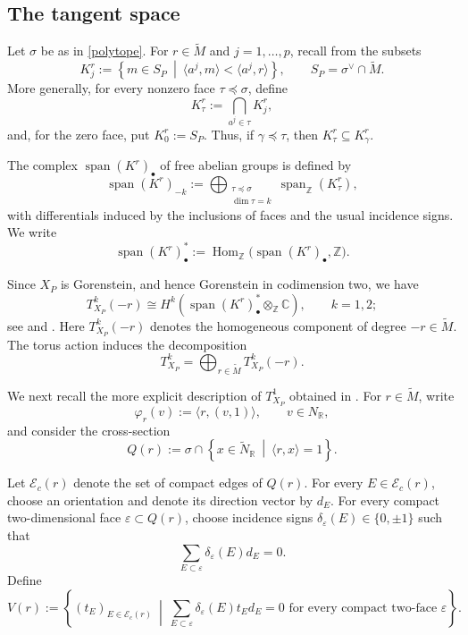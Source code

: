 \documentclass[11pt]{amsart}
\numberwithin{equation}{section}
\theoremstyle{plain}
\theoremstyle{definition}
\newcommand{\0}{$0$-mutable}
\newcommand{\RR}{\ensuremath{\mathbb{R}}}
\newcommand{\CC}{\ensuremath{\mathbb{C}}}
\newcommand{\ZZ}{\ensuremath{\mathbb{Z}}}
\renewcommand{\1}{$1$-rigid}
\renewcommand{\0}{$0$-mutable}
\begin{document}
\subsection{The tangent space}

Let \(\sigma\) be as in \eqref{polytope}. For
\(r\in\widetilde M\) and \(j=1,\ldots,p\), recall from
\cite{AS98,Alt00} the subsets
\[
K_j^r
:=
\left\{
m\in S_P
\ \middle|\
\langle a^j,m\rangle<\langle a^j,r\rangle
\right\},
\qquad
S_P=\sigma^\vee\cap\widetilde M.
\]
More generally, for every nonzero face \(\tau\preceq\sigma\), define
\[
K_\tau^r
:=
\bigcap_{a^j\in\tau}K_j^r,
\]
and, for the zero face, put
$
K_0^r:=S_P.
$
Thus, if \(\gamma\preceq\tau\), then
$
K_\tau^r\subseteq K_\gamma^r.
$

The complex \(\operatorname{span}(K^r)_\bullet\) of free abelian
groups is defined by
\[
\operatorname{span}(K^r)_{-k}
:=
\bigoplus_{\substack{\tau\preceq\sigma\\\dim\tau=k}}
\operatorname{span}_{\ZZ}(K_\tau^r),
\]
with differentials induced by the inclusions of faces and the usual
incidence signs. We write
\[
\operatorname{span}(K^r)_\bullet^*
:=
\operatorname{Hom}_{\ZZ}
\bigl(\operatorname{span}(K^r)_\bullet,\ZZ\bigr).
\]




Since \(X_P\) is Gorenstein, and hence Gorenstein in codimension two,
we have
\begin{equation}
\label{eq tk eq}
T^k_{X_P}(-r)
\cong
H^k\left(
\operatorname{span}(K^r)_\bullet^*
\otimes_{\ZZ}\CC
\right),
\qquad
k=1,2;
\end{equation}
see \cite[Propositions~5.3 and~5.4]{AS98} and
\cite[Theorem~2.1]{Alt00}. Here \(T^k_{X_P}(-r)\) denotes the
homogeneous component of degree \(-r\in\widetilde M\). The torus
action induces the decomposition
\[
T^k_{X_P}
=
\bigoplus_{r\in\widetilde M}T^k_{X_P}(-r).
\]

We next recall the more explicit description of \(T^1_{X_P}\)
obtained in \cite{Alt00}. For \(r\in\widetilde M\), write
\[
\varphi_r(v)
:=
\langle r,(v,1)\rangle,
\qquad
v\in N_{\RR},
\]
and consider the cross-section
\[
Q(r)
:=
\sigma\cap
\left\{
x\in\widetilde N_{\RR}
\ \middle|\
\langle r,x\rangle=1
\right\}.
\]

Let \(\mathcal E_c(r)\) denote the set of compact edges of \(Q(r)\).
For every \(E\in\mathcal E_c(r)\), choose an orientation and denote
its direction vector by \(d_E\). For every compact two-dimensional
face \(\varepsilon\subset Q(r)\), choose incidence signs
$
\delta_\varepsilon(E)\in\{0,\pm1\}
$
such that
\[
\sum_{E\subset\varepsilon}
\delta_\varepsilon(E)d_E=0.
\]
Define
\[
V(r)
:=
\left\{
(t_E)_{E\in\mathcal E_c(r)}
\ \middle|\
\sum_{E\subset\varepsilon}
\delta_\varepsilon(E)t_Ed_E=0
\text{ for every compact two-face }\varepsilon
\right\}.
\]
\end{document}
